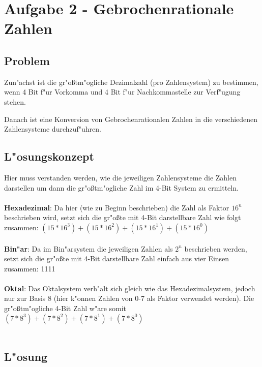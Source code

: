 \documentclass[a4paper,11pt,titlepage]{article}
\begin{document}
    \section{Aufgabe 2 - Gebrochenrationale Zahlen}

    \subsection{Problem}
    Zun"achst ist die gr"oßtm"ogliche Dezimalzahl (pro Zahlensystem) zu bestimmen, wenn 4 Bit f"ur Vorkomma und 4 Bit f"ur Nachkommastelle zur Verf"ugung stehen.

    Danach ist eine Konversion von Gebrochenrationalen Zahlen in die verschiedenen Zahlensysteme durchzuf"uhren.

    \subsection{L"osungskonzept}
    Hier muss verstanden werden, wie die jeweiligen Zahlensysteme die Zahlen darstellen um dann die gr"oßtm"ogliche Zahl im 4-Bit System zu ermitteln. \\ \\

    \noindent \textbf{Hexadezimal}: Da hier (wie zu Beginn beschrieben) die Zahl als Faktor $16^n$ beschrieben wird, setzt sich die gr"oßte mit 4-Bit darstellbare Zahl wie folgt zusammen: $(15 * 16^3) + (15 * 16^2) + (15 * 16^1) + (15 * 16^0)$ \\ \\
    \noindent \textbf{Bin"ar}: Da im Bin"arsystem die jeweiligen Zahlen als $2^n$ beschrieben werden, setzt sich die gr"oßte mit 4-Bit darstellbare Zahl einfach aus vier Einsen zusammen: 1111 \\ \\
    \noindent \textbf{Oktal}: Das Oktalsystem verh"alt sich gleich wie das Hexadezimalsystem, jedoch nur zur Basis 8 (hier k"onnen Zahlen von 0-7 als Faktor verwendet werden). Die gr"oßtm"ogliche 4-Bit Zahl w"are somit $(7 * 8^3) + (7 * 8^2) + (7 * 8^1) + (7 * 8^0)$ \\ \\

    \subsection{L"osung}
\end{document}
